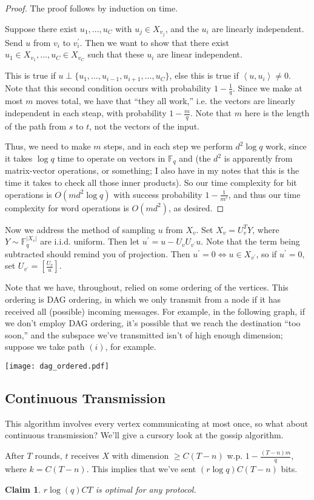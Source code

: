 \documentclass[11pt]{article}
\newcommand{\F}{\mathbb{F}}
\newtheorem{claim}[theorem]{Claim}
\begin{document}
\begin{proof}
The proof follows by induction on time.

Suppose there exist $u_1, \dots, u_C$ with $u_j \in X_{v_j}$, and the $u_i$ are linearly independent. Send $u$ from $v_i$ to $v_i^\prime$. Then we want to show that there exist $u_1 \in X_{v_1}, \dots, u_C \in X_{v_C}$ such that these $u_i$ are linear independent.

This is true if $u \perp \{u_1, \ldots, u_{i-1}, u_{i+1}, \ldots, u_C\}$, else this is true if $\left<u, u_i\right> \neq 0$. Note that this second condition occurs with probability $1 - \frac{1}{q}$.  Since we make at most $m$ moves total, we have that ``they all work,'' i.e. the vectors are linearly independent in each steap, with probability $1 - \frac{m}{q}$. Note that $m$ here is the length of the path from $s$ to $t$, not the vectors of the input.

Thus, we need to make $m$ steps, and in each step we perform $d^2\log q$ work, since it takes $\log q$ time to operate on vectors in $\F_q$ and (the $d^2$ is apparently from matrix-vector operations, or something; I also have in my notes that this is the time it takes to check all those inner products).  So our time complexity for bit operations is $O(md^2 \log q)$ with success probability $1 - \frac{1}{m^c}$, and thus our time complexity for word operations is $O(md^2)$, as desired.
\end{proof}

Now we address the method of sampling $u$ from $X_v$. Set $X_v = U_v^TY$, where $Y \sim \F_q^{|X_v|}$ are i.i.d. uniform. Then let $u^\prime = u - U_vU_{v^\prime}u$. Note that the term being subtracted should remind you of projection. Then $u^\prime = 0 \iff u \in X_{v^\prime}$, so if $u^\prime = 0$, set $U_{v^\prime} = \left[\frac{U_v}{u}\right]$.

Note that we have, throughout, relied on some ordering of the vertices. This ordering is DAG ordering, in which we only transmit from a node if it has received all (possible) incoming messages. For example, in the following graph, if we don't employ DAG ordering, it's possible that we reach the destination ``too soon,'' and the subspace we've transmitted isn't of high enough dimension; suppose we take path $(i)$, for example.

\begin{center}
\texttt{[image: dag\_ordered.pdf]}
\end{center}

\subsection{Continuous Transmission}

This algorithm involves every vertex communicating at most once, so what about continuous transmission?  We'll give a cursory look at the gossip algorithm.

After $T$ rounds, $t$ receives $X$ with dimension $\geq C(T-n)$ w.p. $1 - \frac{(T - n)m}{q}$, where $k = C(T-n)$. This implies that we've sent $(r\log q)C(T-n)$ bits.

\begin{claim}
$r\log(q) CT$ is optimal for any protocol.
\end{claim}
\end{document}
